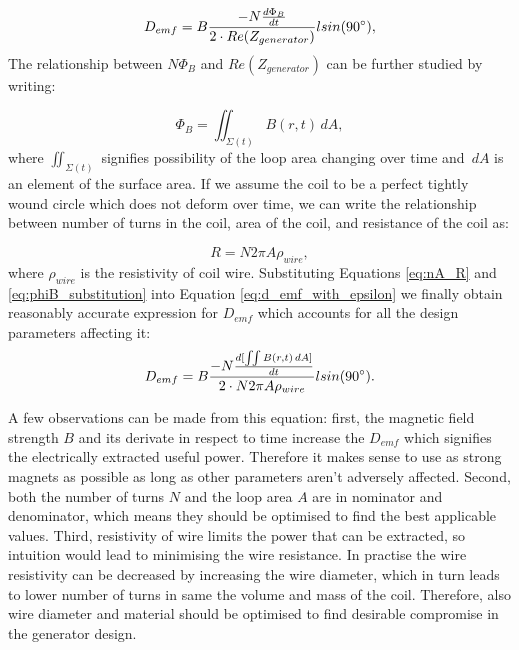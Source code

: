 \begin{equation}\label{eq:d_emf_with_epsilon}
  D_{emf} = B \frac{-N \frac{d \Phi_{B}}{d t}}{2 \cdot Re(Z_{generator})} l sin(90 \degree),
\end{equation}
The relationship between $N \Phi_{B}$ and $Re(Z_{generator})$ can be further studied by writing: 

\begin{equation}\label{eq:phiB_substitution}
  \Phi_{B} = \iint_{\Sigma (t)} B(r, t) \,dA,
\end{equation}
where $ \iint_{\Sigma (t)} $ signifies possibility of the loop area changing over time and $\,dA$ is an element of the surface area. If we assume the coil to be a perfect tightly wound circle which does not deform over time, we can write the relationship between number of turns in the coil, area of the coil, and resistance of the coil as:

\begin{equation}\label{eq:nA_R}
  R = N 2\pi A \rho_{wire},
\end{equation}
where $\rho_{wire}$ is the resistivity of coil wire. Substituting Equations \eqref{eq:nA_R} and \eqref{eq:phiB_substitution} into Equation \eqref{eq:d_emf_with_epsilon} we finally obtain reasonably accurate expression for $D_{emf}$ which accounts for all the design parameters affecting it:
\begin{equation}\label{eq:d_emf_complete}
  D_{emf} = B \frac{-N \frac{d [\iint B(r, t) \,dA]}{d t}}{2 \cdot N 2\pi A \rho_{wire}} l sin(90 \degree).
\end{equation}

A few observations can be made from this equation: first, the magnetic field strength $B$ and its derivate in respect to time increase the $D_{emf}$ which signifies the electrically extracted useful power. Therefore it makes sense to use as strong magnets as possible as long as other parameters aren't adversely affected. Second, both the number of turns $N$ and the loop area $A$ are in nominator and denominator, which means they should be optimised to find the best applicable values. Third, resistivity of wire limits the power that can be extracted, so intuition would lead to minimising the wire resistance. In practise the wire resistivity can be decreased by increasing the wire diameter, which in turn leads to lower number of turns in same the volume and mass of the coil. Therefore, also wire diameter and material should be optimised to find desirable compromise in the generator design. 

